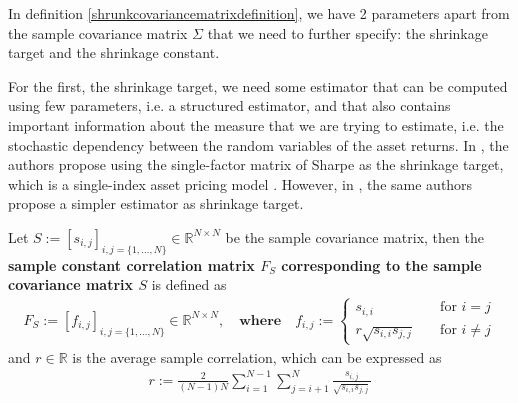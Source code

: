     	In definition \ref{shrunkcovariancematrixdefinition}, we have 2 parameters apart from the sample covariance matrix $\Sigma$ that we need to further specify: the shrinkage target and the shrinkage constant.
    	
    	For the first, the shrinkage target, we need some estimator that can be computed using few parameters, i.e. a structured estimator, and that also contains important information about the measure that we are trying to estimate, i.e. the stochastic dependency between the random variables of the asset returns. In \cite{ledoit2003}, the authors propose using the single-factor matrix of Sharpe as the shrinkage target, which is a single-index asset pricing model \cite{sharpesim}. However, in \cite{ledoit}, the same authors propose a simpler estimator as shrinkage target.
    	
    	\begin{definition}
    	    Let $S := [s_{i,j}]_{i,j= \{1, \dots, N \}} \in \mathbb{R}^{N \times N}$ be the sample covariance matrix, then the \textbf{sample constant correlation matrix $F_S$ corresponding to the sample covariance matrix $S$} is defined as
    	    \begin{align*}
    	        F_S := [f_{i,j}]_{i,j= \{1, \dots, N \}} \in \mathbb{R}^{N \times N}, \quad \textbf{where} \quad f_{i,j} := \begin{cases}
    	        s_{i,i} &\quad \text{for } i=j \\
    	        r \sqrt{s_{i,i} s_{j,j}} &\quad \text{for } i \neq j
    	        \end{cases}
    	    \end{align*}
    	    and $r \in \mathbb{R}$ is the average sample correlation, which can be expressed as
    	    \begin{align}\label{averagesamplecorrelation}
    	        r := \frac{2}{(N-1) N} \sum_{i=1}^{N-1} \sum_{j=i+1}^N \frac{s_{i,j}}{\sqrt{s_{i,i} s_{j,j}}}
    	    \end{align}
    	\end{definition}
    	
